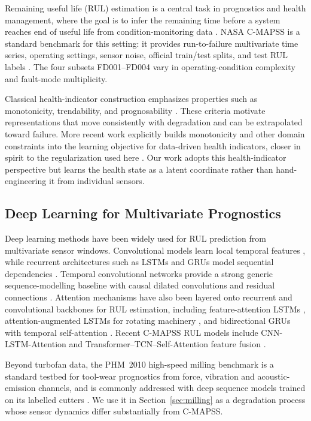 \documentclass[a4paper,fleqn]{cas-sc}
\begin{document}
Remaining useful life (RUL) estimation is a central task in prognostics and
health management, where the goal is to infer the remaining time before a
system reaches end of useful life from condition-monitoring data
\citep{si2011remaining}. NASA C-MAPSS is a standard benchmark for this setting:
it provides run-to-failure multivariate time series, operating settings,
sensor noise, official train/test splits, and test RUL labels
\citep{nasa_cmapss,saxena2008turbofan,saxena2008damage}. The four subsets FD001--FD004 vary in
operating-condition complexity and fault-mode multiplicity.

Classical health-indicator construction emphasizes properties such as
monotonicity, trendability, and prognosability
\citep{coble2009identifying}. These criteria motivate representations that move
consistently with degradation and can be extrapolated toward failure. More
recent work explicitly builds monotonicity and other domain constraints into
the learning objective for data-driven health indicators, closer in spirit to
the regularization used here \citep{tefera2025constraint}. Our work
adopts this health-indicator perspective but learns the health state as a
latent coordinate rather than hand-engineering it from individual sensors.

\subsection{Deep Learning for Multivariate Prognostics}

Deep learning methods have been widely used for RUL prediction from
multivariate sensor windows. Convolutional models learn local temporal features
\citep{babu2016deep,li2018deepcnn}, while recurrent architectures such as LSTMs
and GRUs model sequential dependencies
\citep{zheng2017lstm,hochreiter1997lstm,cho2014gru}. Temporal convolutional
networks provide a strong generic sequence-modelling baseline with causal
dilated convolutions and residual connections \citep{bai2018tcn}. Attention
mechanisms have also been layered onto recurrent and convolutional backbones
for RUL estimation, including feature-attention LSTMs
\citep{liu2021featureattention}, attention-augmented LSTMs for rotating
machinery \citep{zhang2020attentionlstm}, and bidirectional GRUs with temporal
self-attention \citep{zhang2022bigru}. Recent C-MAPSS RUL models include
CNN-LSTM-Attention \citep{deng2024cnnlstmattention}
and Transformer--TCN--Self-Attention feature fusion \citep{li2025ttsnet}.

Beyond turbofan data, the PHM~2010 high-speed milling benchmark \citep{phm2010} is
a standard testbed for tool-wear prognostics from force, vibration and
acoustic-emission channels, and is commonly addressed with deep sequence models
trained on its labelled cutters \citep{zhang2023toolwear}. We use it in
Section~\ref{sec:milling} as a degradation process whose sensor dynamics differ
substantially from C-MAPSS.
\end{document}
